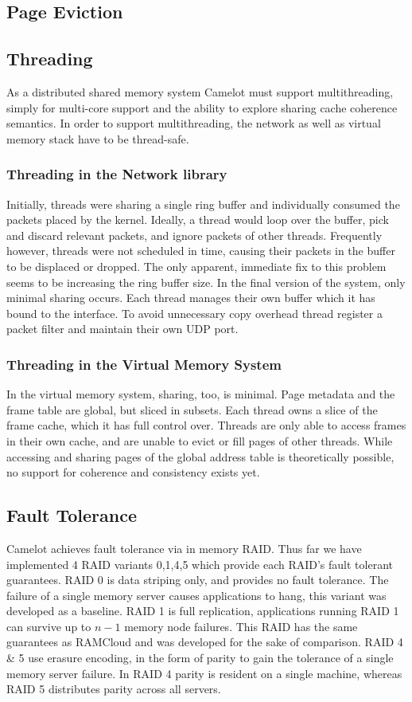 \subsection{Page Eviction} 

\subsection{Threading} 
As a distributed shared memory system Camelot must support multithreading, simply for multi-core support and the ability to explore sharing cache coherence semantics.
In order to support multithreading, the network as well as virtual memory stack have to be thread-safe.
\subsubsection{Threading in the Network library}
Initially, threads were sharing a single ring buffer and individually consumed the packets placed by the kernel. Ideally, a thread would loop over the buffer, pick and discard relevant packets, and ignore packets of other threads. Frequently however, threads were not scheduled in time, causing their packets in the buffer to be displaced or dropped. The only apparent, immediate fix to this problem seems to be increasing the ring buffer size.
In the final version of the system, only minimal sharing occurs. Each thread manages their own buffer which it has bound to the interface. To avoid unnecessary copy overhead thread register a packet filter and maintain their own UDP port.

\subsubsection{Threading in the Virtual Memory System}
In the virtual memory system,  sharing, too, is minimal. Page metadata and the frame table are global, but sliced in subsets. Each thread owns a slice of the frame cache, which it has full control over. Threads are only able to access frames in their own cache, and are unable to evict or fill pages of other threads. While accessing and sharing pages of the global address table is theoretically possible, no support for coherence and consistency exists yet. 

\subsection{Fault Tolerance} 
Camelot achieves fault tolerance via in memory RAID. Thus far we have
implemented 4 RAID variants 0,1,4,5 which provide each RAID's fault
tolerant guarantees. RAID 0 is data striping only, and provides no
fault tolerance. The failure of a single memory server causes
applications to hang, this variant was developed as a baseline. RAID 1
is full replication, applications running RAID 1 can survive up to
$n-1$ memory node failures. This RAID has the same guarantees as
RAMCloud and was developed for the sake of comparison. RAID 4 \& 5
use erasure encoding, in the form of parity to gain the tolerance of
a single memory server failure. In RAID 4 parity is resident on a
single machine, whereas RAID 5 distributes parity across all servers.

